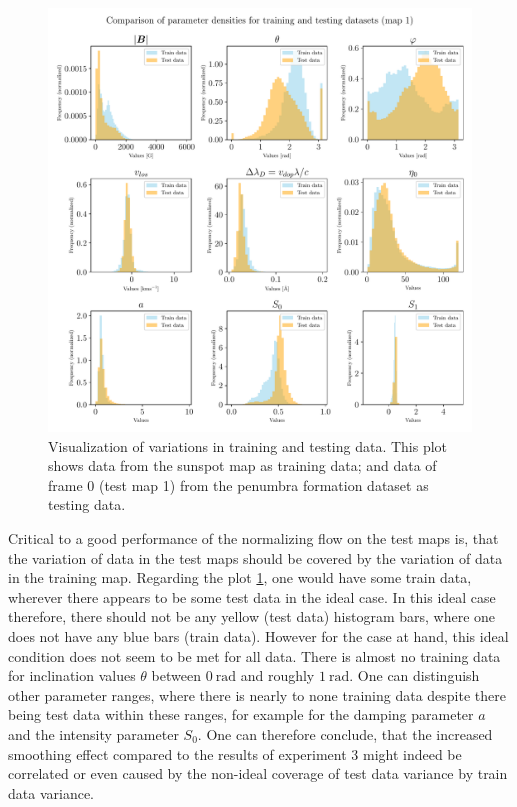\documentclass[a4paper,12pt]{report}
\begin{document}
\begin{figure}[h!]
\centering
\includegraphics[width=\textwidth]{figures/nf-milne-eddington-example-4-nflows-piecewisequadratic-comp-paramdens-traintest-1.pdf}
\caption{Visualization of variations in training and testing data. This plot shows data from the sunspot map as training data; and data of frame 0 (test map 1) from the penumbra formation dataset as testing data.}
\label{fig:nf-milne-eddington-example-4-nflows-piecewisequadratic-comp-paramdens-traintest-1}
\end{figure} Critical to a good performance of the normalizing flow on the test maps is, that the variation of data in the test maps should be covered by the variation of data in the training map. Regarding the plot \cref{fig:nf-milne-eddington-example-4-nflows-piecewisequadratic-comp-paramdens-traintest-1}, one would have some train data, wherever there appears to be some test data in the ideal case. In this ideal case therefore, there should not be any yellow (test data) histogram bars, where one does not have any blue bars (train data). However for the case at hand, this ideal condition does not seem to be met for all data. There is almost no training data for inclination values $\theta$ between $\SI{0}{\radian}$ and roughly $\SI{1}{\radian}$. One can distinguish other parameter ranges, where there is nearly to none training data despite there being test data within these ranges, for example for the damping parameter $a$ and the intensity parameter $S_0$. One can therefore conclude, that the increased smoothing effect compared to the results of experiment 3 might indeed be correlated or even caused by the non-ideal coverage of test data variance by train data variance.
\end{document}
